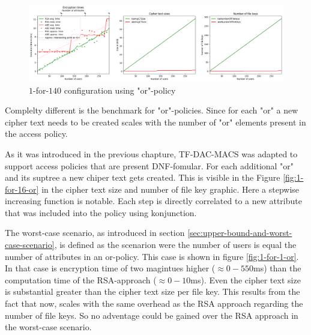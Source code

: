 \begin{figure}[!t]
\centering
    \includegraphics[width=\linewidth]{img/eval-or-policy/encrypt_incrementing_10_attribute_increment_1per140User.png}
    \caption{$1$-for-$140$ configuration using "or"-policy}
    \label{fig:1-for-140-or}
\end{figure}

Complelty different is the benchmark for "or"-policies. Since for each "or" a new cipher text needs to be created \name scales with the number of "or" elements present in the access policy.




As it was introduced in the previous chapture, TF-DAC-MACS was adapted to support access policies that are present DNF-fomular. For each additional "or" and its suptree a new chiper text gets created. This is visible in the Figure \ref{fig:1-for-16-or} in the cipher text size and number of file key graphic. Here a stepwise increasing function is notable. Each step is directly correlated to a new attribute that was included into the policy using konjunction.

The worst-case scenario, as introduced in section \ref{sec:upper-bound-and-worst-case-scenario}, is defined as the scenarion were the number of users is equal the number of attributes in an or-policy. This case is shown in figure \ref{fig:1-for-1-or}. In that case is encryption time of \name two magintues higher ($\approx 0-550$ms) than the computation time of the RSA-approach ($\approx 0-10$ms). Even the cipher text size is substantial greater than the cipher text size per file key. This results from the fact that now, \name scales with the same overhead as the RSA approach regarding the number of file keys. So no adventage could be gained over the RSA approach in the worst-case scenario.

